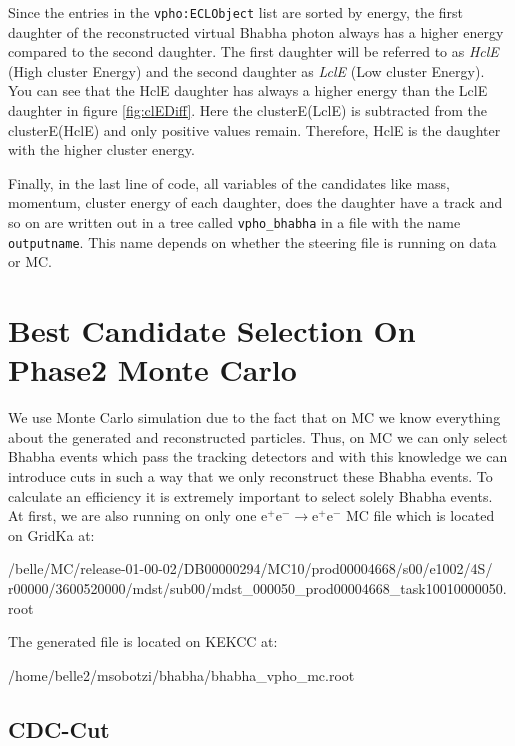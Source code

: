 \documentclass[a4paper,11pt,twosided,final,german,openbib,pdftex,listof=totoc,bibliography=totoc]{scrbook}
\begin{document}
Since the entries in the \texttt{vpho:ECLObject} list are sorted by energy, the first daughter of the reconstructed virtual Bhabha photon always has a higher energy compared to the second daughter. The first daughter will be referred to as \textit{HclE} (High cluster Energy) and the second daughter as \textit{LclE} (Low cluster Energy). You can see that the HclE daughter has always a higher energy than the LclE daughter in figure \ref{fig:clEDiff}. Here the clusterE(LclE) is subtracted from the clusterE(HclE) and only positive values remain. Therefore, HclE is the daughter with the higher cluster energy.

Finally, in the last line of code, all variables of the candidates like mass, momentum, cluster energy of each daughter, does the daughter have a track and so on are written out in a tree called \texttt{vpho\_bhabha} in a file with the name \texttt{outputname}. This name depends on whether the steering file is running on data or MC.


\section{Best Candidate Selection On Phase2 Monte Carlo}
\label{sec:SelectingBhabhaMC}

We use Monte Carlo simulation due to the fact that on MC we know everything about the generated and reconstructed particles. Thus, on MC we can only select Bhabha events which pass the tracking detectors and with this knowledge we can introduce cuts in such a way that we only reconstruct these Bhabha events. To calculate an efficiency it is extremely important to select solely Bhabha events. At first, we are also running on only one $\textrm{e}^+ \textrm{e}^- \rightarrow \textrm{e}^+ \textrm{e}^-$ MC file which is located on GridKa at:
\newline

/belle/MC/release-01-00-02/DB00000294/MC10/prod00004668/s00/e1002/4S/
r00000/3600520000/mdst/sub00/mdst\_000050\_prod00004668\_task10010000050.root
\newline

The generated file is located on KEKCC at:
\newline 

 /home/belle2/msobotzi/bhabha/bhabha\_vpho\_mc.root
\newline


\subsection{CDC-Cut}
\end{document}
